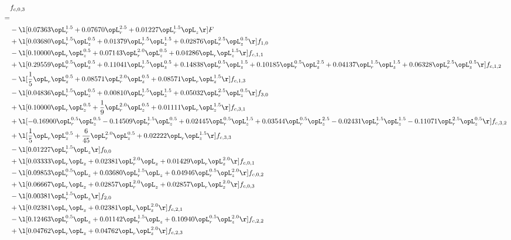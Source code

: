 \begin{alignat}{2} 
\label{eq:f_03_1} 
& f_{c,0,3} \nonumber \\ 
 = \\ 
& - \l[  0.07363 \opL_r^{1.5} +  0.07670 \opL_r^{2.5} +  0.01227 \opL_r^{1.5} \opL_z  \r] F \nonumber \\ 
& + \l[  0.03680 \opL_r^{1.5} \opL_z^{0.5} +  0.01379 \opL_r^{1.5} \opL_z^{1.5} +  0.02876 \opL_r^{2.5} \opL_z^{0.5}  \r] f_{1,0} \nonumber \\ 
& - \l[  0.10000 \opL_r \opL_z^{0.5} +  0.07143 \opL_r^{2.0} \opL_z^{0.5} +  0.04286 \opL_r \opL_z^{1.5}  \r] f_{c,1,1} \nonumber \\ 
& + \l[  0.29559 \opL_r^{0.5} \opL_z^{0.5} +  0.11041 \opL_r^{1.5} \opL_z^{0.5} +  0.14838 \opL_r^{0.5} \opL_z^{1.5} +  0.10185 \opL_r^{0.5} \opL_z^{2.5} +  0.04137 \opL_r^{1.5} \opL_z^{1.5} +  0.06328 \opL_r^{2.5} \opL_z^{0.5}  \r] f_{c,1,2} \nonumber \\ 
& - \l[ \frac{1}{5} \opL_r \opL_z^{0.5} +  0.08571 \opL_r^{2.0} \opL_z^{0.5} +  0.08571 \opL_r \opL_z^{1.5}  \r] f_{c,1,3} \nonumber \\ 
& - \l[  0.04836 \opL_r^{1.5} \opL_z^{0.5} +  0.00810 \opL_r^{1.5} \opL_z^{1.5} +  0.05032 \opL_r^{2.5} \opL_z^{0.5}  \r] f_{3,0} \nonumber \\ 
& + \l[  0.10000 \opL_r \opL_z^{0.5} + \frac{1}{9} \opL_r^{2.0} \opL_z^{0.5} +  0.01111 \opL_r \opL_z^{1.5}  \r] f_{c,3,1} \nonumber \\ 
& + \l[  -0.16900 \opL_r^{0.5} \opL_z^{0.5}   -0.14509 \opL_r^{1.5} \opL_z^{0.5} +  0.02445 \opL_r^{0.5} \opL_z^{1.5} +  0.03544 \opL_r^{0.5} \opL_z^{2.5}   -0.02431 \opL_r^{1.5} \opL_z^{1.5}   -0.11071 \opL_r^{2.5} \opL_z^{0.5}  \r] f_{c,3,2} \nonumber \\ 
& + \l[ \frac{1}{5} \opL_r \opL_z^{0.5} + \frac{6}{45} \opL_r^{2.0} \opL_z^{0.5} +  0.02222 \opL_r \opL_z^{1.5}  \r] f_{c,3,3} \nonumber \\ 
& - \l[  0.01227 \opL_r^{1.5} \opL_z  \r] f_{0,0} \nonumber \\ 
& + \l[  0.03333 \opL_r \opL_z +  0.02381 \opL_r^{2.0} \opL_z +  0.01429 \opL_r \opL_z^{2.0}  \r] f_{c,0,1} \nonumber \\ 
& - \l[  0.09853 \opL_r^{0.5} \opL_z +  0.03680 \opL_r^{1.5} \opL_z +  0.04946 \opL_r^{0.5} \opL_z^{2.0}  \r] f_{c,0,2} \nonumber \\ 
& + \l[  0.06667 \opL_r \opL_z +  0.02857 \opL_r^{2.0} \opL_z +  0.02857 \opL_r \opL_z^{2.0}  \r] f_{c,0,3} \nonumber \\ 
& - \l[  0.00381 \opL_r^{1.5} \opL_z  \r] f_{2,0} \nonumber \\ 
& + \l[  0.02381 \opL_r \opL_z +  0.02381 \opL_r \opL_z^{2.0}  \r] f_{c,2,1} \nonumber \\ 
& - \l[  0.12463 \opL_r^{0.5} \opL_z +  0.01142 \opL_r^{1.5} \opL_z +  0.10940 \opL_r^{0.5} \opL_z^{2.0}  \r] f_{c,2,2} \nonumber \\ 
& + \l[  0.04762 \opL_r \opL_z +  0.04762 \opL_r \opL_z^{2.0}  \r] f_{c,2,3} \nonumber \\ 
\end{alignat} 


